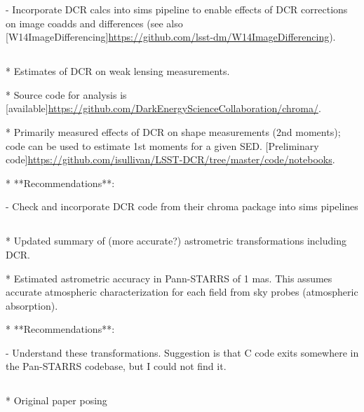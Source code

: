 \documentclass[]{article}
\begin{document}
- Incorporate DCR calcs into sims pipeline to enable effects of DCR corrections on image coadds and differences (see also [W14ImageDifferencing]\url{https://github.com/lsst-dm/W14ImageDifferencing}).

\subsection{\cite{Meyers2015}}

* Estimates of DCR on weak lensing measurements.

* Source code for analysis is [available]\url{https://github.com/DarkEnergyScienceCollaboration/chroma/}.

* Primarily measured effects of DCR on shape measurements (2nd moments); code can be used to estimate 1st moments for a given SED. [Preliminary code]\url{https://github.com/isullivan/LSST-DCR/tree/master/code/notebooks}.

* **Recommendations**:

- Check and incorporate DCR code from their chroma package into sims pipelines

\subsection{\cite{Chambers2005}}

* Updated summary of (more accurate?) astrometric transformations including DCR.

* Estimated astrometric accuracy in Pann-STARRS of 1 mas. This assumes accurate atmospheric characterization for each field from sky probes (atmospheric absorption).

* **Recommendations**:

- Understand these transformations. Suggestion is that C code exits somewhere in the Pan-STARRS codebase, but I could not find it.

\subsection{\cite{Cuby1998}}

\subsection{\cite{Filippenko1982}}

* Original paper posing 

\subsection{\cite{AlejandroPlazas2012}}

\subsection{\cite{Stone1996}}





\end{document}
